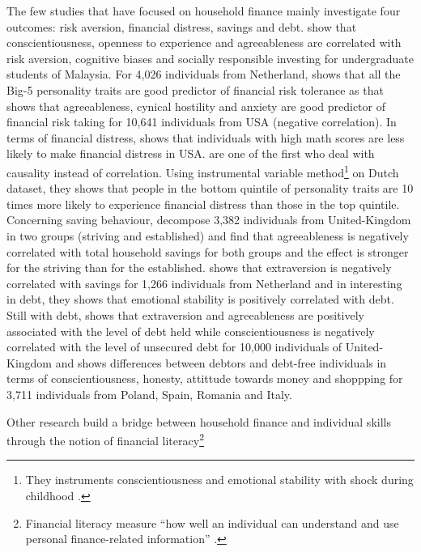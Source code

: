 \documentclass[a4paper, 11pt, onecolumn]{article}
\begin{document}
The few studies that have focused on household finance mainly investigate four outcomes: risk aversion, financial distress, savings and debt.
\cite{Nga2013} show that conscientiousness, openness to experience and agreeableness are correlated with risk aversion, cognitive biases and socially responsible investing for undergraduate students of Malaysia.
For 4,026 individuals from Netherland, \cite{Pinjisakikool2017} shows that all the Big-5 personality traits are good predictor of financial risk tolerance as \cite{Bucciol2017} that shows that agreeableness, cynical hostility and anxiety are good predictor of financial risk taking for 10,641 individuals from USA (negative correlation).
In terms of financial distress, \cite{Agarwal2013} shows that individuals with high math scores are less likely to make financial distress in USA.
\cite{Parise2019} are one of the first who deal with causality instead of correlation.
Using instrumental variable method\footnote{They instruments conscientiousness and emotional stability with shock during childhood .} on Dutch dataset, they shows that people in the bottom quintile of personality traits are 10 times more likely to experience financial distress than those in the top quintile.
Concerning saving behaviour, \cite{Gerhard2018} decompose 3,382 individuals from United-Kingdom in two groups (striving and established) and find that agreeableness is negatively correlated with total household savings for both groups and the effect is stronger for the striving than for the established.
\cite{Nyhus2001} shows that extraversion is negatively correlated with savings for 1,266 individuals from Netherland and in interesting in debt, they shows that emotional stability is positively correlated with debt.
Still with debt, \cite{Brown2014} shows that extraversion and agreeableness are positively associated with the level of debt held while conscientiousness is negatively correlated with the level of unsecured debt for 10,000 individuals of United-Kingdom and \cite{Forlicz2019} shows differences between debtors and debt-free individuals in terms of conscientiousness, honesty, attittude towards money and shoppping for 3,711 individuals from Poland, Spain, Romania and Italy.

Other research build a bridge between household finance and individual skills through the notion of financial literacy\footnote{Financial literacy measure ``how well an individual can understand and use personal finance-related information'' \citep{Huston2010}.} \citep{Hastings2013} \citep{Gaurav2012} \citep{Klapper2012}
\end{document}
